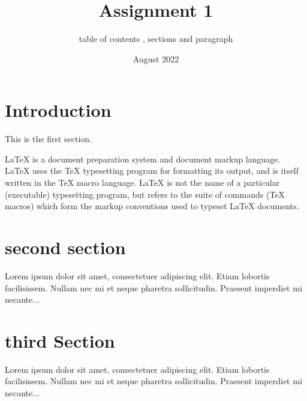 \documentclass{article}
\title{Assignment 1}
\author{table of contents , sections and paragraph}
\date{August 2022}
\begin{document}
  
\maketitle
  
\tableofcontents

\section{Introduction}
   
This is the first section.
      
La\TeX{} is a document preparation system and document markup 
language. \LaTeX{} uses the \TeX{} typesetting program for formatting 
its output, and is itself written in the \TeX{} macro language. 
\LaTeX{} is not the name of a particular (executable) typesetting program, but 
refers to the suite of commands (\TeX{} macros) which form the markup 
conventions used to typeset \LaTeX{} documents.
       
\section{second section}


Lorem ipsum dolor sit amet, consectetuer adipiscing elit.  
Etiam lobortis facilisissem.  Nullam nec mi et neque pharetra 
sollicitudin.  Praesent imperdiet mi necante...

\section{third Section}
       
Lorem ipsum dolor sit amet, consectetuer adipiscing elit.  
Etiam lobortis facilisissem.  Nullam nec mi et neque pharetra 
sollicitudin.  Praesent imperdiet mi necante...
\end{document}
